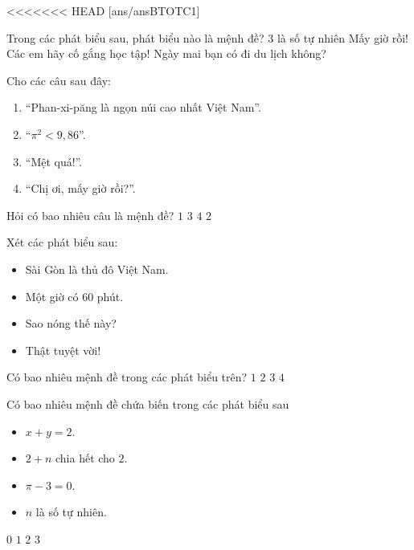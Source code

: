 <<<<<<< HEAD
[ans/ansBTOTC1]
\begin{ex}%
	Trong các phát biểu sau, phát biểu nào là mệnh đề?
	\choice
	{\True $3$ là số tự nhiên}
	{Mấy giờ rồi!}
	{Các em hãy cố gắng học tập!}
	{Ngày mai bạn có đi du lịch không?}
\end{ex}

\begin{ex}%
	Cho các câu sau đây:
	\begin{enumerate}
		\item ``Phan-xi-păng là ngọn núi cao nhất Việt Nam''.
		\item ``$\pi^2<9,86$''.
		\item ``Mệt quá!''.
		\item ``Chị ơi, mấy giờ rồi?''.
	\end{enumerate}
	Hỏi có bao nhiêu câu là mệnh đề?
	\choice
	{$1$}
	{$3$}
	{$4$}
	{\True $2$}
\end{ex}
\begin{ex}%
	Xét các phát biểu sau:
	\begin{itemize}
		\item Sài Gòn là thủ đô Việt Nam.
		\item Một giờ có 60 phút.
		\item Sao nóng thế này?
		\item Thật tuyệt vời!
	\end{itemize}
	Có bao nhiêu mệnh đề trong các phát biểu trên?
	\choice
	{$1$}
	{\True $2$}
	{$3$}
	{$4$}
\end{ex}

\begin{ex}%
	Có bao nhiêu mệnh đề chứa biến trong các phát biểu sau
	\begin{itemize}
		\item $x+y=2$.
		\item $2+n$ chia hết cho $2$.
		\item $\pi -3 =0$.
		\item $n$ là số tự nhiên.
	\end{itemize}
	\choice
	{$0$}
	{$1$}
	{$2$}
	{\True $3$}
\end{ex}

